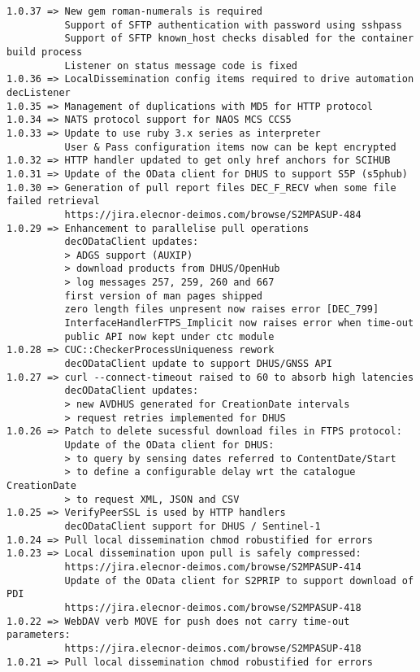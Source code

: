 \documentclass[dec_sum_main.tex]{subfiles}
\begin{document}
\begin{Verbatim}[tabsize=4]
1.0.37 => New gem roman-numerals is required
          Support of SFTP authentication with password using sshpass
          Support of SFTP known_host checks disabled for the container build process
          Listener on status message code is fixed
1.0.36 => LocalDissemination config items required to drive automation decListener
1.0.35 => Management of duplications with MD5 for HTTP protocol
1.0.34 => NATS protocol support for NAOS MCS CCS5
1.0.33 => Update to use ruby 3.x series as interpreter
          User & Pass configuration items now can be kept encrypted
1.0.32 => HTTP handler updated to get only href anchors for SCIHUB
1.0.31 => Update of the OData client for DHUS to support S5P (s5phub)
1.0.30 => Generation of pull report files DEC_F_RECV when some file failed retrieval
          https://jira.elecnor-deimos.com/browse/S2MPASUP-484
1.0.29 => Enhancement to parallelise pull operations
          decODataClient updates:
          > ADGS support (AUXIP)
          > download products from DHUS/OpenHub
          > log messages 257, 259, 260 and 667
          first version of man pages shipped
          zero length files unpresent now raises error [DEC_799]
          InterfaceHandlerFTPS_Implicit now raises error when time-out 
          public API now kept under ctc module
1.0.28 => CUC::CheckerProcessUniqueness rework
          decODataClient update to support DHUS/GNSS API
1.0.27 => curl --connect-timeout raised to 60 to absorb high latencies
          decODataClient updates:
          > new AVDHUS generated for CreationDate intervals
          > request retries implemented for DHUS
1.0.26 => Patch to delete sucessful download files in FTPS protocol:
          Update of the OData client for DHUS:
          > to query by sensing dates referred to ContentDate/Start
          > to define a configurable delay wrt the catalogue CreationDate
          > to request XML, JSON and CSV
1.0.25 => VerifyPeerSSL is used by HTTP handlers
          decODataClient support for DHUS / Sentinel-1
1.0.24 => Pull local dissemination chmod robustified for errors
1.0.23 => Local dissemination upon pull is safely compressed:
          https://jira.elecnor-deimos.com/browse/S2MPASUP-414
          Update of the OData client for S2PRIP to support download of PDI
          https://jira.elecnor-deimos.com/browse/S2MPASUP-418
1.0.22 => WebDAV verb MOVE for push does not carry time-out parameters:
          https://jira.elecnor-deimos.com/browse/S2MPASUP-418
1.0.21 => Pull local dissemination chmod robustified for errors

\end{Verbatim}
\end{document}

